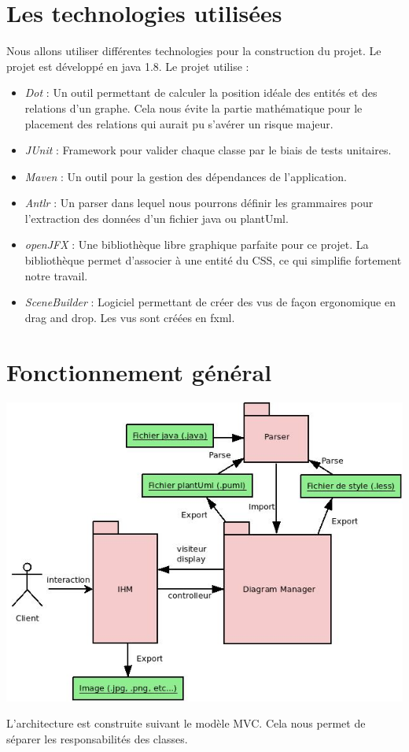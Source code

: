 \documentclass[a4paper,10pt]{article}
\begin{document}
\section{Les technologies utilisées}
Nous allons utiliser différentes technologies pour la construction du projet.
\newline
Le projet est développé en java 1.8.
Le projet utilise :
\begin{itemize}
 \item \emph{Dot} : Un outil permettant de calculer la position idéale des entités et des relations d'un graphe. 
 Cela nous évite la partie mathématique pour le placement des relations qui aurait pu s'avérer un risque majeur.
 \item \emph{JUnit} : Framework pour valider chaque classe par le biais de tests unitaires.
 \item \emph{Maven} : Un outil pour la gestion des dépendances de l'application.
 \item \emph{Antlr} : Un parser dans lequel nous pourrons définir les grammaires pour l'extraction des données d'un fichier java ou plantUml.
 \item \emph{openJFX} : Une bibliothèque libre graphique parfaite pour ce projet. La bibliothèque permet d'associer à une entité du CSS,
			ce qui simplifie fortement notre travail.
 \item \emph{SceneBuilder} : Logiciel permettant de créer des vus de façon ergonomique en drag and drop. Les vus sont créées en fxml.  
\end{itemize}

\section{Fonctionnement général}
  \begin{center}
      \includegraphics[width=\textwidth]{Image/generalDal.jpg}
  \end{center}
  L'architecture est construite suivant le modèle MVC. Cela nous permet de séparer les responsabilités des classes.
 
\end{document}
